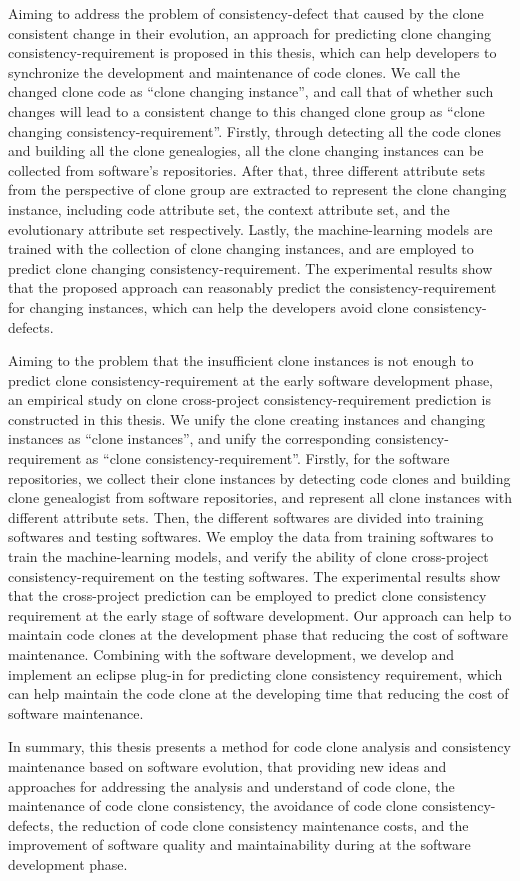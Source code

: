 {Aiming to address the problem of consistency-defect that caused by the clone consistent change in their evolution, an approach for predicting clone changing consistency-requirement is proposed in this thesis, which can help developers to synchronize the development and maintenance of code clones. 
We call the changed clone code as ``clone changing instance'', and call that of whether such changes will lead to a consistent change to this changed clone group as ``clone changing consistency-requirement''.
Firstly, through detecting all the code clones and building all the clone genealogies, all the clone changing instances can be collected from software's repositories.
After that, three different attribute sets from the perspective of clone group are extracted to represent the clone changing instance, including code attribute set, the context attribute set, and the evolutionary attribute set respectively.
Lastly, the machine-learning models are trained with the collection of clone changing instances, and are employed to predict clone changing consistency-requirement.
The experimental results show that the proposed approach can reasonably predict the consistency-requirement for changing instances, which can help the developers avoid clone consistency-defects.

Aiming to the problem that the insufficient clone instances is not enough to predict clone consistency-requirement at the early software development phase, an empirical study on clone cross-project consistency-requirement prediction is constructed in this thesis.
We unify the clone creating instances and changing instances as ``clone instances'', and unify the corresponding consistency-requirement as ``clone consistency-requirement''.
Firstly, for the software repositories, we collect their clone instances by detecting code clones and building clone genealogist from software repositories, and represent all clone instances with different attribute sets.
Then, the different softwares are divided into training softwares and testing softwares.
We employ the data from training softwares to train the machine-learning models, and verify the ability of clone cross-project consistency-requirement on the testing softwares.
The experimental results show that the cross-project prediction can be employed to predict clone consistency requirement at the early stage of software development.
Our approach can help to maintain code clones at the development phase that reducing the cost of software maintenance.
Combining with the software development, we develop and implement an eclipse plug-in for predicting clone consistency requirement, which can help maintain the code clone at the developing time that reducing the cost of software maintenance.

In summary, this thesis presents a method for code clone analysis and consistency maintenance based on software evolution, that providing new ideas and approaches for addressing the analysis and understand of code clone, the maintenance of code clone consistency, the avoidance of code clone consistency-defects, the reduction of code clone consistency maintenance costs, and the improvement of software quality and maintainability during at the software development phase.
}

\makecover
\clearpage 
